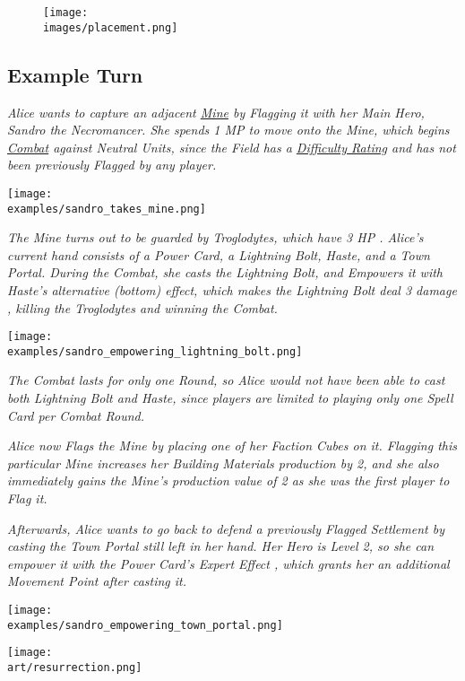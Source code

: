 \begin{figure*}[!hb]
  \centering
  \texttt{[image: \\images/placement.png]}
\end{figure*}

\clearpage

\subsection*{Example Turn}

\begin{multicols*}{2}

\textit{Alice wants to capture an adjacent \hyperlink{Mines}{Mine} by Flagging it with her Main Hero, Sandro the Necromancer.
    She spends 1 MP to move onto the Mine, which begins \hyperlink{Combat}{Combat} against Neutral Units, since the Field has a \hyperlink{Difficulty}{Difficulty Rating} and has not been previously Flagged by any player.}\par

\texttt{[image: \\examples/sandro\_takes\_mine.png]}

\textit{The Mine turns out to be guarded by Troglodytes, which have 3 HP .
Alice's current hand consists of a Power Card, a Lightning Bolt, Haste, and a Town Portal.
During the Combat, she casts the Lightning Bolt, and Empowers  it with Haste's alternative (bottom) effect, which makes the Lightning Bolt deal 3 damage , killing the Troglodytes and winning the Combat.}

\texttt{[image: \\examples/sandro\_empowering\_lightning\_bolt.png]}

\textit{The Combat lasts for only one Round, so Alice would not have been able to cast both Lightning Bolt and Haste, since players are limited to playing only one Spell Card per Combat Round.}\par


\textit{Alice now Flags the Mine by placing one of her Faction Cubes on it.
    Flagging this particular Mine increases her Building Materials  production by 2, and she also immediately gains the Mine's production value of 2  as she was the first player to Flag it.}\par
\textit{Afterwards, Alice wants to go back to defend a previously Flagged Settlement by casting the Town Portal still left in her hand.
    Her Hero is Level 2, so she can empower it with the Power Card's Expert Effect , which grants her an additional Movement Point after casting it.
}

\texttt{[image: \\examples/sandro\_empowering\_town\_portal.png]}

\vfill
\hspace{2em}
\texttt{[image: \\art/resurrection.png]}
\end{multicols*}
